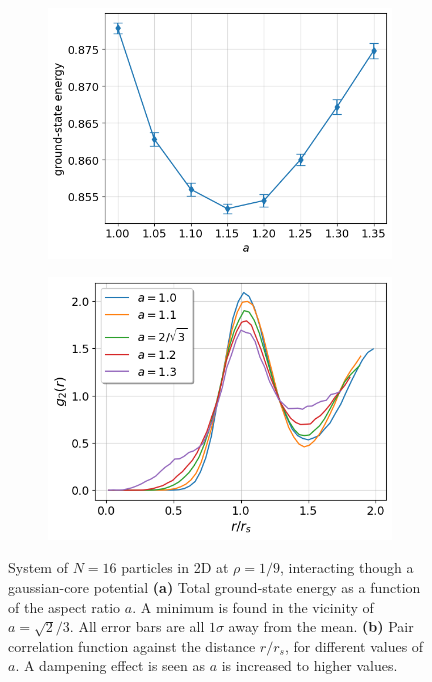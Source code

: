 \documentclass[a4paper, 12pt, oneside]{article}
\begin{document}
\begin{figure}[H]
    \begin{subfigure}{0.5\textwidth}
        \centering
        \includegraphics[width=1.0\textwidth]{figures/gs_energy_against_a_iters=2000.png}
        \caption{}
        \label{fig:gs_energy_diff_a}
    \end{subfigure}
    \begin{subfigure}{0.5\textwidth}
        \centering
        \includegraphics[width=1.0\textwidth]{figures/corr_func_diff_a_2.png}
        \caption{}
        \label{fig:corr_func_diff_a}
    \end{subfigure}
    \caption{System of $N=16$ particles in 2D at $\rho=1/9$, interacting though a gaussian-core potential \textbf{(a)} Total ground-state energy as a function of
    the aspect ratio $a$. A minimum is found in the vicinity of $a=\sqrt{2}/3$. All error bars are all $1\sigma$ away from the 
    mean. \textbf{(b)} Pair correlation function against the distance $r/r_s$, for different values of 
    $a$. A dampening effect is seen as $a$ is increased to higher values.}
\end{figure}
\end{document}
